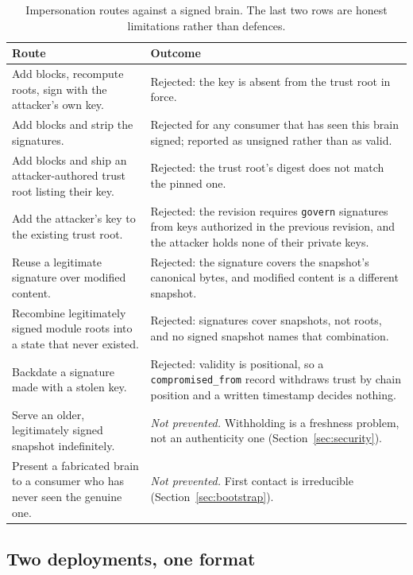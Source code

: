 \documentclass[11pt,a4paper]{article}
\begin{document}
\begin{table}[htbp]
\centering
\caption{Impersonation routes against a signed brain. The last two rows are
honest limitations rather than defences.}
\label{tab:attacks}
\begin{tabularx}{\textwidth}{YY}
\toprule
\textbf{Route} & \textbf{Outcome} \\
\midrule
Add blocks, recompute roots, sign with the attacker's own key. &
  Rejected: the key is absent from the trust root in force. \\
Add blocks and strip the signatures. &
  Rejected for any consumer that has seen this brain signed; reported as
  unsigned rather than as valid. \\
Add blocks and ship an attacker-authored trust root listing their key. &
  Rejected: the trust root's digest does not match the pinned one. \\
Add the attacker's key to the existing trust root. &
  Rejected: the revision requires \texttt{govern} signatures from keys
  authorized in the previous revision, and the attacker holds none of their
  private keys. \\
Reuse a legitimate signature over modified content. &
  Rejected: the signature covers the snapshot's canonical bytes, and modified
  content is a different snapshot. \\
Recombine legitimately signed module roots into a state that never existed. &
  Rejected: signatures cover snapshots, not roots, and no signed snapshot names
  that combination. \\
Backdate a signature made with a stolen key. &
  Rejected: validity is positional, so a \texttt{compromised\_from} record
  withdraws trust by chain position and a written timestamp decides nothing. \\
\midrule
Serve an older, legitimately signed snapshot indefinitely. &
  \emph{Not prevented.} Withholding is a freshness problem, not an authenticity
  one (Section~\ref{sec:security}). \\
Present a fabricated brain to a consumer who has never seen the genuine one. &
  \emph{Not prevented.} First contact is irreducible
  (Section~\ref{sec:bootstrap}). \\
\bottomrule
\end{tabularx}
\end{table}

\subsection{Two deployments, one format}
\label{sec:deployments}
\end{document}
